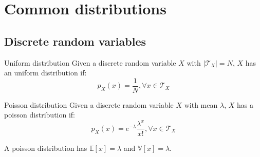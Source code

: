 \section{Common distributions}

\subsection{Discrete random variables}
\begin{descriptionlist}
    \item[Uniform distribution] 
        Given a discrete random variable $X$ with $\vert \mathcal{T}_X \vert = N$,
        $X$ has an uniform distribution if:
        \[ p_X(x) = \frac{1}{N}, \forall x \in \mathcal{T}_X \]
    
    \item[Poisson distribution] 
        Given a discrete random variable $X$ with mean $\lambda$,
        $X$ has a poisson distribution if:
        \[ p_X(x) = e^{-\lambda} \frac{\lambda^x}{x!}, \forall x \in \mathcal{T}_X \]

        A poisson distribution has $\mathbb{E}[x] = \lambda$ and $\mathbb{V}[x] = \lambda$.
\end{descriptionlist}


